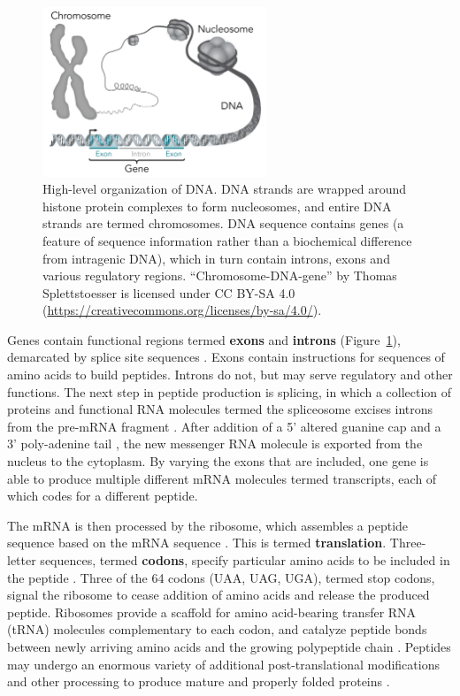 \begin{figure}[htb]
    \centering
    \includegraphics[width=0.6\textwidth,keepaspectratio]{images/intro/Chromosome-DNA-gene}
    \caption[High-level organization of DNA.]{High-level organization of DNA\@. DNA strands are wrapped around histone protein complexes to form nucleosomes, and entire DNA strands are termed chromosomes. DNA sequence contains genes (a feature of sequence information rather than a biochemical difference from intragenic DNA), which in turn contain introns, exons and various regulatory regions. ``Chromosome-DNA-gene'' by Thomas Splettstoesser is licensed under CC BY-SA 4.0 (\url{https://creativecommons.org/licenses/by-sa/4.0/}).}
    \label{fig:intro:dna_hierarchy}
\end{figure}
Genes contain functional regions termed \textbf{exons} and \textbf{introns} (Figure~\ref{fig:intro:dna_hierarchy}), demarcated by splice site sequences \cite{jo2015}. Exons contain instructions for sequences of amino acids to build peptides. Introns do not, but may serve regulatory and other functions. The next step in peptide production is splicing, in which a collection of proteins and functional RNA molecules termed the spliceosome excises introns from the pre-mRNA fragment \cite{will2011}. After addition of a 5' altered guanine cap \cite{shatkin1976} and a 3' poly-adenine tail \cite{guhaniyogi2001}, the new messenger RNA molecule is exported from the nucleus to the cytoplasm. By varying the exons that are included, one gene is able to produce multiple different mRNA molecules termed transcripts, each of which codes for a different peptide.

The mRNA is then processed by the ribosome, which assembles a peptide sequence based on the mRNA sequence \cite{horton19_2006}. This is termed \textbf{translation}. Three-letter sequences, termed \textbf{codons}, specify particular amino acids to be included in the peptide \cite{nirenberg2004}. Three of the 64 codons (UAA, UAG, UGA), termed stop codons, signal the ribosome to cease addition of amino acids and release the produced peptide. Ribosomes provide a scaffold for amino acid-bearing transfer RNA (tRNA) molecules complementary to each codon, and catalyze peptide bonds between newly arriving amino acids and the growing polypeptide chain \cite{steitz2008}. Peptides may undergo an enormous variety of additional post-translational modifications and other processing to produce mature and properly folded proteins \cite{conibear2020}.

